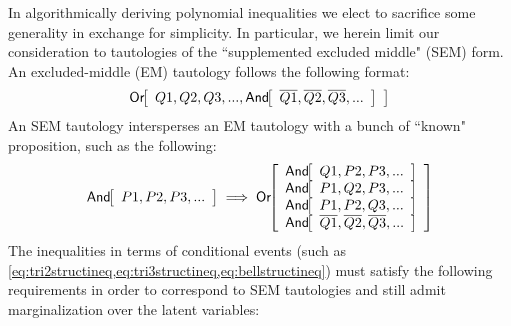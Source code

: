 \bigskip
In algorithmically deriving polynomial inequalities we elect to sacrifice some generality in exchange for simplicity. In particular, we herein limit our consideration to tautologies of the ``supplemented excluded middle" (SEM) form. An excluded-middle (EM) tautology follows the following format: 
\begin{align}
\NamedFunction{Or}{Q1 , Q2 , Q3 ,..., \NamedFunction{And}{\n{Q1} ,\n{Q2},\n{Q3},...}}
\end{align}
An SEM tautology intersperses an EM tautology with a bunch of ``known" proposition, such as the following:
\begin{align}
\NamedFunction{And}{P1, P2 , P3 , ...} \implies 
\NamedFunction{Or}{
  \NamedFunction{And}{Q1, P2 , P3 , ...}
\\\NamedFunction{And}{P1, Q2 , P3 , ...}
\\\NamedFunction{And}{P1, P2 , Q3 , ...}
\\\NamedFunction{And}{\n{Q1} ,\n{Q2},\n{Q3},...}
}
\end{align}
The inequalities in terms of conditional events (such as \cref{eq:tri2structineq,eq:tri3structineq,eq:bellstructineq}) must satisfy the following requirements in order to correspond to SEM tautologies and still admit marginalization over the latent variables:
